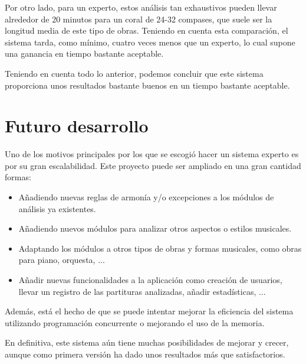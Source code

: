 Por otro lado, para un experto, estos análisis tan exhaustivos pueden llevar alrededor de 20 minutos para un coral de 24-32 compases, que suele ser la longitud media de este tipo de obras. Teniendo en cuenta esta comparación, el sistema tarda, como mínimo, cuatro veces menos que un experto, lo cual supone una ganancia en tiempo bastante aceptable.

\bigskip
Teniendo en cuenta todo lo anterior, podemos concluir que este sistema proporciona unos resultados bastante buenos en un tiempo bastante aceptable. 

\section{Futuro desarrollo}

Uno de los motivos principales por los que se escogió hacer un sistema experto es por su gran escalabilidad. Este proyecto puede ser ampliado en una gran cantidad formas:

\begin{itemize}

	\item Añadiendo nuevas reglas de armonía y/o excepciones a los módulos de análisis ya existentes.
	\item Añadiendo nuevos módulos para analizar otros aspectos o estilos musicales.
	\item Adaptando los módulos a otros tipos de obras y formas musicales, como obras para piano, orquesta, ...
	\item Añadir nuevas funcionalidades a la aplicación como creación de usuarios, llevar un registro de las partituras analizadas, añadir estadísticas, ...
\end{itemize}

Además, está el hecho de que se puede intentar mejorar la eficiencia del sistema utilizando programación concurrente o mejorando el uso de la memoria.

\bigskip
En definitiva, este sistema aún tiene muchas posibilidades de mejorar y crecer, aunque como primera versión ha dado unos resultados más que satisfactorios.